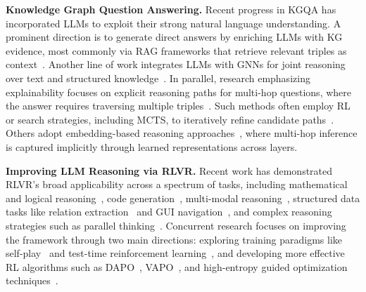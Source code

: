 \textbf{Knowledge Graph Question Answering.}
Recent progress in KGQA has incorporated LLMs to exploit their strong natural language understanding. A prominent direction is to generate direct answers by enriching LLMs with KG evidence, most commonly via RAG frameworks that retrieve relevant triples as context~\citep{linders2025knowledge}. Another line of work integrates LLMs with GNNs for joint reasoning over text and structured knowledge~\citep{xu2025harnessing,yasunaga2021qa,he2024g}. In parallel, research emphasizing explainability focuses on explicit reasoning paths for multi-hop questions, where the answer requires traversing multiple triples~\citep{zhou2018interpretable,chakraborty2024multi,zhang2018variational}. Such methods often employ RL or search strategies, including MCTS, to iteratively refine candidate paths~\citep{shen2025reasoning}. Others adopt embedding-based reasoning approaches~\citep{saxena2020improving,shi2021transfernet}, where multi-hop inference is captured implicitly through learned representations across layers.

\textbf{Improving LLM Reasoning via RLVR.}
Recent work has demonstrated RLVR's broad applicability across a spectrum of tasks, including mathematical and logical reasoning~\citep{guo2025deepseek}, code generation~\citep{wang2025code}, multi-modal reasoning~\citep{huang2025vision, wang2025vl,li2025self}, structured data tasks like relation extraction~\citep{dai2025r1} and GUI navigation~\citep{shi2025mobilegui}, and complex reasoning strategies such as parallel thinking~\citep{zheng2025parallel}. Concurrent research focuses on improving the framework through two main directions: exploring training paradigms like self-play~\citep{liu2025spiral, huang2025r} and test-time reinforcement learning~\citep{zuo2025ttrl}, and developing more effective RL algorithms such as DAPO~\citep{yu2025dapo}, VAPO~\citep{yue2025vapo}, and high-entropy guided optimization techniques~\citep{dai2025cde,wang2025beyond,Zhou2025EvolvingLM}.